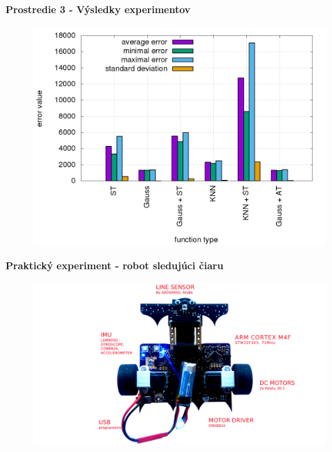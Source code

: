 \documentclass[xcolor=dvipsnames]{beamer}
\begin{document}
\begin{frame}{\bf Prostredie 3 - Výsledky experimentov}

\begin{figure}[!htb]
\centering
\includegraphics[scale=.36]{../../results_q_learning/map_3/trials_average_results.png}
\end{figure}

\end{frame}






\begin{frame}{\bf Praktický experiment - robot sledujúci čiaru}

\begin{figure}[!htb]
\centering
\includegraphics[scale=.09]{../pictures/robot_hardware_white.jpg}
\end{figure}

\end{frame}
\end{document}
